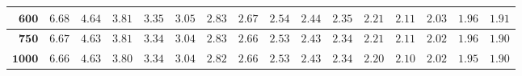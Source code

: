 \begin{customTableWrapper}{1.4}
\begin{longtable}{|r|r|r|r|r|r|r|r|r|r|r|r|r|r|r|r|}
    ${\mathbf{600}}$  & ${6.68}$   & ${4.64}$   & ${3.81}$   & ${3.35}$   & ${3.05}$   & ${2.83}$   & ${2.67}$   & ${2.54}$   & ${2.44}$   & ${2.35}$   & ${2.21}$   & ${2.11}$   & ${2.03}$   & ${1.96}$   & ${1.91}$   \\ \hline 
    ${\mathbf{750}}$  & ${6.67}$   & ${4.63}$   & ${3.81}$   & ${3.34}$   & ${3.04}$   & ${2.83}$   & ${2.66}$   & ${2.53}$   & ${2.43}$   & ${2.34}$   & ${2.21}$   & ${2.11}$   & ${2.02}$   & ${1.96}$   & ${1.90}$   \\ \hline 
    ${\mathbf{1000}}$  & ${6.66}$   & ${4.63}$   & ${3.80}$   & ${3.34}$   & ${3.04}$   & ${2.82}$   & ${2.66}$   & ${2.53}$   & ${2.43}$   & ${2.34}$   & ${2.20}$   & ${2.10}$   & ${2.02}$   & ${1.95}$   & ${1.90}$   \\ \hline 


\end{longtable}
\end{customTableWrapper}
\changefontsizes{10pt}

\setlength{\LTleft}{0in} %
\setlength{\LTright}{0in} %


\newpage

